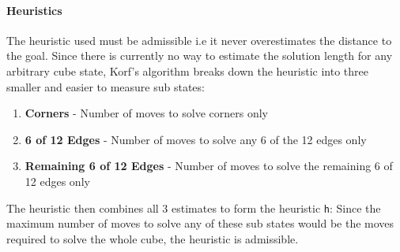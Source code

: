 \documentclass[titlepage]{report}[12pt]
\begin{document}
\paragraph{Heuristics}
The heuristic used must be admissible i.e it never overestimates the distance to the goal. Since there is currently no way to estimate the solution length for any arbitrary cube state, Korf's algorithm breaks down the heuristic into three smaller and easier to measure sub states:
\begin{enumerate}
\item \textbf{Corners} - Number of moves to solve corners only
\item \textbf{6 of 12 Edges} - Number of moves to solve any 6 of the 12 edges only
\item \textbf{Remaining 6 of 12 Edges} - Number of moves to solve the remaining 6 of 12 edges only
\end{enumerate}
The heuristic then combines all 3 estimates to form the heuristic \texttt{h}:
Since the maximum number of moves to solve any of these sub states would be the moves required to solve the whole cube, the heuristic is admissible.
\end{document}

